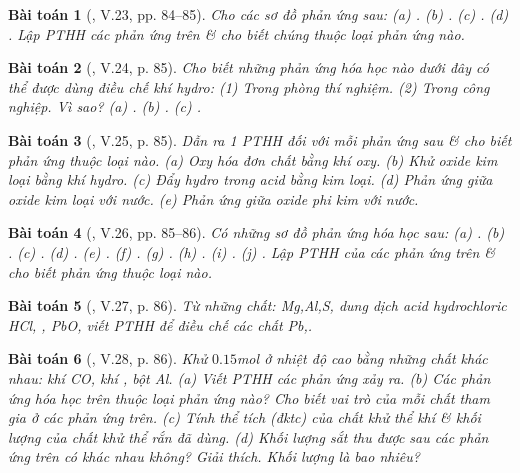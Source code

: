 \documentclass{article}
\newtheorem{baitoan}{Bài toán}
\begin{document}
\begin{baitoan}[\cite{Truong_BTNC_Hoa_Hoc_8_2022}, V.23, pp. 84--85]
	Cho các sơ đồ phản ứng sau: (a) \emph{}. (b) \emph{}. (c) \emph{}. (d) \emph{}. Lập PTHH các phản ứng trên \& cho biết chúng thuộc loại phản ứng nào.
\end{baitoan}

\begin{baitoan}[\cite{Truong_BTNC_Hoa_Hoc_8_2022}, V.24, p. 85]
	Cho biết những phản ứng hóa học nào dưới đây có thể được dùng điều chế khí hydro: (1) Trong phòng thí nghiệm. (2) Trong công nghiệp. Vì sao? (a) \emph{}. (b) \emph{}. (c) \emph{}.
\end{baitoan}

\begin{baitoan}[\cite{Truong_BTNC_Hoa_Hoc_8_2022}, V.25, p. 85]
	Dẫn ra 1 PTHH đối với mỗi phản ứng sau \& cho biết phản ứng thuộc loại nào. (a) Oxy hóa đơn chất bằng khí oxy. (b) Khử oxide kim loại bằng khí hydro. (c) Đẩy hydro trong acid bằng kim loại. (d) Phản ứng giữa oxide kim loại với nước. (e) Phản ứng giữa oxide phi kim với nước.
\end{baitoan}

\begin{baitoan}[\cite{Truong_BTNC_Hoa_Hoc_8_2022}, V.26, pp. 85--86]
	Có những sơ đồ phản ứng hóa học sau: (a) \emph{}. (b) \emph{}. (c) \emph{}. (d) \emph{}. (e) \emph{}. (f) \emph{}. (g) \emph{}. (h) \emph{}. (i) \emph{}. (j) \emph{}. Lập PTHH của các phản ứng trên \& cho biết phản ứng thuộc loại nào.
\end{baitoan}

\begin{baitoan}[\cite{Truong_BTNC_Hoa_Hoc_8_2022}, V.27, p. 86]
	Từ những chất: \emph{Mg,Al,S}, dung dịch acid hydrochloric \emph{HCl, , PbO}, viết PTHH để điều chế các chất \emph{Pb,}.
\end{baitoan}

\begin{baitoan}[\cite{Truong_BTNC_Hoa_Hoc_8_2022}, V.28, p. 86]
	Khử $0.15$\emph{mol } ở nhiệt độ cao bằng những chất khác nhau: khí \emph{CO}, khí \emph{}, bột \emph{Al}. (a) Viết PTHH các phản ứng xảy ra. (b) Các phản ứng hóa học trên thuộc loại phản ứng nào? Cho biết vai trò của mỗi chất tham gia ở các phản ứng trên. (c) Tính thể tích (đktc) của chất khử thể khí \& khối lượng của chất khử thể rắn đã dùng. (d) Khối lượng sắt thu được sau các phản ứng trên có khác nhau không? Giải thích. Khối lượng là bao nhiêu?
\end{baitoan}
\end{document}
